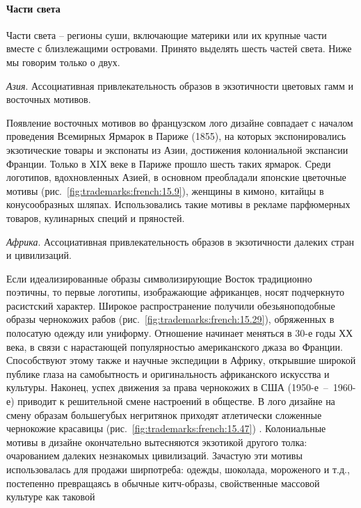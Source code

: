 \paragraph{Части света}

 Части света -- регионы суши, включающие материки или их
  крупные части вместе с близлежащими островами. Принято выделять шесть частей
  света. Ниже мы говорим только о двух.

\emph{Азия}. Ассоциативная привлекательность образов в экзотичности цветовых
    гамм и восточных мотивов.

    Появление восточных мотивов во французском лого дизайне совпадает с началом
    проведения Всемирных Ярмарок в Париже (1855), на которых экспонировались
    экзотические товары и экспонаты из Азии, достижения колониальной экспансии
    Франции. Только в ХIХ веке в Париже прошло шесть таких ярмарок. Среди логотипов,
    вдохновленных Азией, в основном преобладали японские цветочные мотивы
    (рис.~\ref{fig:trademarks:french:15.9}), женщины в кимоно, китайцы в
    конусообразных шляпах.  Использовались такие мотивы в рекламе парфюмерных
    товаров, кулинарных специй и пряностей. %

\emph{Африка}. Ассоциативная привлекательность образов в экзотичности далеких
    стран и цивилизаций.

    Если идеализированные образы символизирующие Восток традиционно поэтичны, то
    первые логотипы, изображающие африканцев, носят подчеркнуто расистский
    характер. Широкое распространение получили обезьяноподобные образы чернокожих
    рабов (рис.~\ref{fig:trademarks:french:15.29}), обряженных в полосатую одежду
    или униформу.  Отношение начинает меняться в 30-е годы ХХ века, в связи с
    нарастающей популярностью американского джаза во Франции. Способствуют этому
    также и научные экспедиции в Африку, открывшие широкой публике глаза на
    самобытность и оригинальность африканского искусства и культуры.  Наконец, успех
    движения за права чернокожих в США (1950-е~--~1960-е) приводит к решительной
    смене настроений в обществе. В лого дизайне на смену образам большегубых
    негритянок приходят атлетически сложенные чернокожие красавицы
    (рис.~\ref{fig:trademarks:french:15.47}) . Колониальные мотивы в дизайне
    окончательно вытесняются экзотикой другого толка: очарованием далеких незнакомых
    цивилизаций. Зачастую эти мотивы использовалась для продажи ширпотреба: одежды,
    шоколада, мороженого и т.д., постепенно превращаясь в обычные китч-образы,
    свойственные массовой культуре как таковой %

